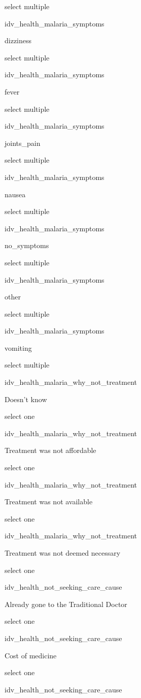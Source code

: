 \documentclass[]{article}
\begin{document}
select multiple

idv\_health\_malaria\_symptoms

dizziness

select multiple

idv\_health\_malaria\_symptoms

fever

select multiple

idv\_health\_malaria\_symptoms

joints\_pain

select multiple

idv\_health\_malaria\_symptoms

nausea

select multiple

idv\_health\_malaria\_symptoms

no\_symptoms

select multiple

idv\_health\_malaria\_symptoms

other

select multiple

idv\_health\_malaria\_symptoms

vomiting

select multiple

idv\_health\_malaria\_why\_not\_treatment

Doesn't know

select one

idv\_health\_malaria\_why\_not\_treatment

Treatment was not affordable

select one

idv\_health\_malaria\_why\_not\_treatment

Treatment was not available

select one

idv\_health\_malaria\_why\_not\_treatment

Treatment was not deemed necessary

select one

idv\_health\_not\_seeking\_care\_cause

Already gone to the Traditional Doctor

select one

idv\_health\_not\_seeking\_care\_cause

Cost of medicine

select one

idv\_health\_not\_seeking\_care\_cause
\end{document}
